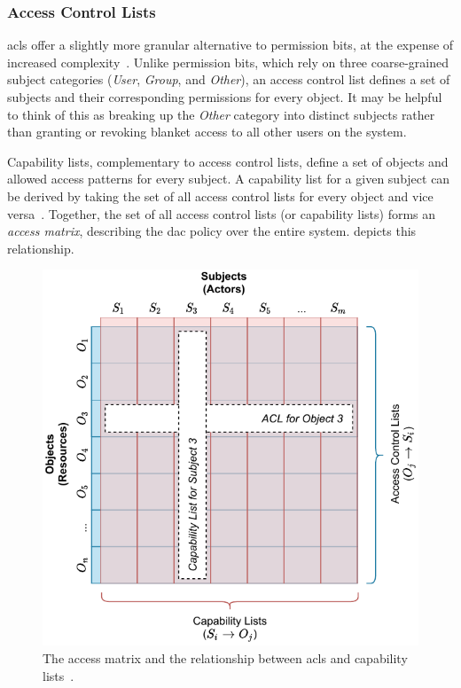 \subsubsection*{Access Control Lists}

\Glspl{acl} offer a slightly more granular alternative to permission bits,
at the expense of increased complexity~\cite{jaeger2008_os_security,
van_oorschot2020_tools_jewels}. Unlike permission bits, which rely on three coarse-grained
subject categories (\textit{User}, \textit{Group}, and \textit{Other}), an access control
list defines a set of subjects and their corresponding permissions for every object. It
may be helpful to think of this as breaking up the \textit{Other} category into distinct
subjects rather than granting or revoking blanket access to all other users on the system.

Capability lists, complementary to access control lists, define a set of objects and
allowed access patterns for every subject. A capability list for a given subject can be
derived by taking the set of all access control lists for every object and vice
versa~\cite{van_oorschot2020_tools_jewels}. Together, the set of all access control lists
(or capability lists) forms an \textit{access matrix}, describing the \gls{dac} policy over
the entire system.  depicts this relationship.

\begin{figure}[tbp]
  \centering
  \includegraphics[width=0.8\linewidth]{figs/background/acl.pdf}
  \caption[The access matrix]{
    The access matrix and the relationship between \glspl{acl} and capability
    lists~\cite{anderson1972_report, van_oorschot2020_tools_jewels, jaeger2008_os_security}.
  }%
  \label{fig:acl}
\end{figure}

